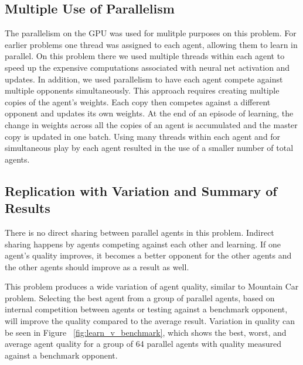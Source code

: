 \begin{flushleft}

\subsection{Multiple Use of Parallelism}
The parallelism on the GPU was used for mulitple purposes on this problem.  For earlier problems one thread was assigned to each agent, allowing them to learn in parallel.  On this problem there we used multiple threads within each agent to speed up the expensive computations associated with neural net activation and updates.  In addition, we used parallelism to have each agent compete against multiple opponents simultaneously.  This approach requires creating multiple copies of the agent’s weights. Each copy then competes against a different opponent and updates its own weights. At the end of an episode of learning, the change in weights across all the copies of an agent is accumulated and the master copy is updated in one batch.  Using many threads within each agent and for simultaneous play by each agent resulted in the use of a smaller number of total agents.

\subsection{Replication with Variation and Summary of Results}
There is no direct sharing between parallel agents in this problem.  Indirect sharing happens by agents competing against each other and learning.  If one agent’s quality improves, it becomes a better opponent for the other agents and the other agents should improve as a result as well.

This problem produces a wide variation of agent quality, similar to Mountain Car problem.  Selecting the best agent from a group of parallel agents, based on internal competition between agents or testing against a benchmark opponent, will improve the quality compared to the average result.  Variation in quality can be seen in Figure ~\ref{fig:learn_v_benchmark}, which shows the best, worst, and average agent quality for a group of 64 parallel agents with quality measured against a benchmark opponent.

\end{flushleft}
